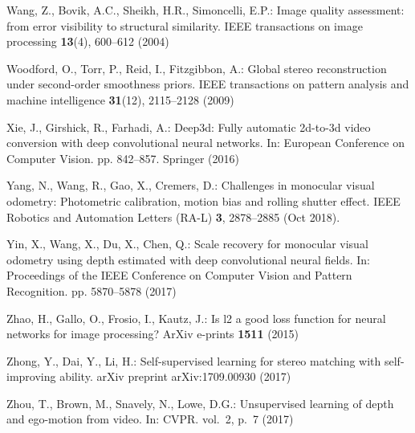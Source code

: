 \documentclass[runningheads]{llncs}
\begin{document}
\begin{thebibliography}{10}
Wang, Z., Bovik, A.C., Sheikh, H.R., Simoncelli, E.P.: Image quality
  assessment: from error visibility to structural similarity. IEEE transactions
  on image processing  \textbf{13}(4),  600--612 (2004)

Woodford, O., Torr, P., Reid, I., Fitzgibbon, A.: Global stereo reconstruction
  under second-order smoothness priors. IEEE transactions on pattern analysis
  and machine intelligence  \textbf{31}(12),  2115--2128 (2009)

Xie, J., Girshick, R., Farhadi, A.: Deep3d: Fully automatic 2d-to-3d video
  conversion with deep convolutional neural networks. In: European Conference
  on Computer Vision. pp. 842--857. Springer (2016)

Yang, N., Wang, R., Gao, X., Cremers, D.: Challenges in monocular visual
  odometry: Photometric calibration, motion bias and rolling shutter effect.
  IEEE Robotics and Automation Letters (RA-L)  \textbf{3},  2878--2885 (Oct
  2018). 

Yin, X., Wang, X., Du, X., Chen, Q.: Scale recovery for monocular visual
  odometry using depth estimated with deep convolutional neural fields. In:
  Proceedings of the IEEE Conference on Computer Vision and Pattern
  Recognition. pp. 5870--5878 (2017)

Zhao, H., Gallo, O., Frosio, I., Kautz, J.: Is l2 a good loss function for
  neural networks for image processing? ArXiv e-prints  \textbf{1511} (2015)

Zhong, Y., Dai, Y., Li, H.: Self-supervised learning for stereo matching with
  self-improving ability. arXiv preprint arXiv:1709.00930  (2017)

Zhou, T., Brown, M., Snavely, N., Lowe, D.G.: Unsupervised learning of depth
  and ego-motion from video. In: CVPR. vol.~2, p.~7 (2017)

\end{thebibliography}
\end{document}
